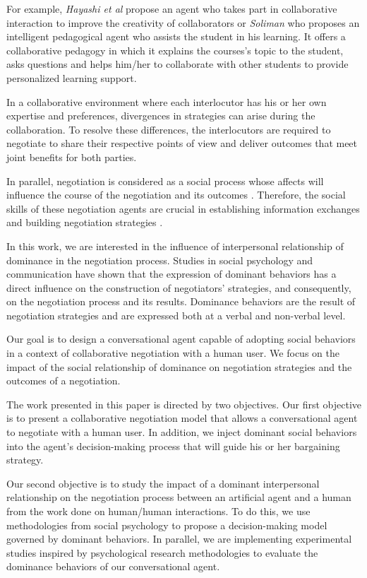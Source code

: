 \documentclass[10pt, a4paper]{article} %
\begin{document}
For example, \emph{Hayashi et al} propose an agent who takes part in collaborative interaction to improve the creativity of collaborators \cite{hayashi2013embodied} or \emph{Soliman} \cite{soliman2010intelligent} who proposes an intelligent pedagogical agent who assists the student in his learning. It offers a collaborative pedagogy in which it explains the courses's topic to the student, asks questions and helps him/her to collaborate with other students to provide personalized learning support.

In a collaborative environment where each interlocutor has his or her own expertise and preferences, divergences in strategies can arise during the collaboration. 
To resolve these differences, the interlocutors are required to negotiate to share their respective points of view and deliver outcomes that meet joint benefits for both parties.  

In parallel, negotiation is considered as a social process whose affects will influence the course of the negotiation and its outcomes \cite{broekens2010affective}. Therefore, the social skills of these negotiation agents are crucial in establishing information exchanges and building negotiation strategies \cite{jin2010study}. 


In this work, we are interested in the influence of interpersonal relationship of dominance in the negotiation process. Studies in social psychology and communication have shown that the expression of dominant behaviors has a direct influence on the construction of negotiators' strategies, and consequently, on the negotiation process and its results.
Dominance behaviors are the result of negotiation strategies and are expressed both at a verbal and non-verbal level.

Our goal is to design a conversational agent capable of adopting social behaviors in a context of collaborative negotiation with a human user. We focus on the impact of the social relationship of dominance on negotiation strategies and the outcomes of a negotiation.

The work presented in this paper is directed by two objectives. 
Our first objective is to present a collaborative negotiation model that allows a conversational agent to negotiate with a human user. In addition, we inject dominant social behaviors into the agent's decision-making process that will guide his or her bargaining strategy.

Our second objective is to study the impact of a dominant interpersonal relationship on the negotiation process between an artificial agent and a human from the work done on human/human interactions.
To do this, we use methodologies from social psychology to propose a decision-making model governed by dominant behaviors. In parallel, we are implementing experimental studies inspired by psychological research methodologies to evaluate the dominance behaviors of our conversational agent. 
\end{document}
